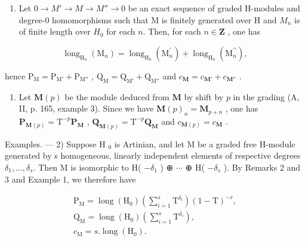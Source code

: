 \begin{enumerate}
\def\labelenumi{\arabic{enumi})}
\setcounter{enumi}{1}
\tightlist
\item
  Let \(0 \to M' \to M \to M'' \to 0\) be an exact sequence of graded H-modules and degree-0 homomorphisms such that M is finitely generated over H and \(M_n\) is of finite length over \(H_0\) for each \(n\). Then, for each \(n \in \mathbf{Z}\) , one has
\end{enumerate}

\[
\operatorname{long} _ {\mathrm{H} _ {0}} \left(\mathrm{M} _ {n}\right) = \operatorname{long} _ {\mathrm{H} _ {0}} \left(\mathrm{M} _ {n} ^ {\prime}\right) + \operatorname{long} _ {\mathrm{H} _ {0}} \left(\mathrm{M} _ {n} ^ {\prime \prime}\right),
\]

hence \(\mathrm{P_M} = \mathrm{P_{M'}} + \mathrm{P_{M''}}\) , \(\mathrm{Q_M} = \mathrm{Q_{M'}} + \mathrm{Q_{M''}}\) and \(c_{\mathbf{M}} = c_{\mathbf{M'}} + c_{\mathbf{M''}}\) .

\begin{enumerate}
\def\labelenumi{\arabic{enumi})}
\setcounter{enumi}{2}
\tightlist
\item
  Let \(\mathbf{M}(p)\) be the module deduced from \(\mathbf{M}\) by shift by \(p\) in the grading (A, II, p. 165, example 3). Since we have \(\mathbf{M}(p)_n = \mathbf{M}_{p+n}\) , one has \(\mathbf{P}_{\mathbf{M}(p)} = \mathrm{T}^{-p}\mathbf{P}_{\mathbf{M}}\) , \(\mathbf{Q}_{\mathbf{M}(p)} = \mathrm{T}^{-p}\mathbf{Q}_{\mathbf{M}}\) and \(c_{\mathbf{M}(p)} = c_{\mathbf{M}}\) .
\end{enumerate}

Examples. --- 2) Suppose H \(_{0}\) is Artinian, and let M be a graded free H-module generated by s homogeneous, linearly independent elements of respective degrees \(\delta_{1}, ..., \delta_{s}\). Then M is isomorphic to H( \(-\delta_{1}\) ) ⊕ \(\cdots\) ⊕ H( \(-\delta_{s}\) ). By Remarks 2 and 3 and Example 1, we therefore have

\[
\begin{array}{l} \mathrm {P_ {M}} = \operatorname{long} (\mathrm {H_ {0}}) \left(\sum_ {i = 1} ^ {s} \mathrm{T} ^ {\delta_ {i}}\right) (1 - \mathrm{T}) ^ {- r}, \\ \mathrm {Q_ {M}} = \operatorname{long} (\mathrm {H_ {0}}) \left(\sum_ {i = 1} ^ {s} \mathrm{T} ^ {\delta_ {i}}\right), \\ c _ {\mathrm{M}} = s. \operatorname{long} (\mathrm {H_ {0}}). \end{array}
\]

